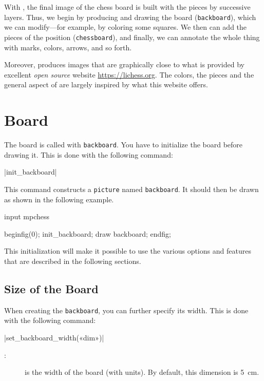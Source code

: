 \documentclass[english]{ltxdoc}
\begin{document}
With \mpchess, the final image of the chess board is built with the pieces
by successive layers. Thus, we begin by producing and drawing the board
(\lstinline+backboard+), which we can modify---for example, by
coloring some squares. We then can add the pieces of the position (\lstinline+chessboard+),
and finally, we can annotate the whole thing with marks, colors,
arrows, and so forth. 


Moreover, \mpchess produces images that are graphically close to what is
provided by excellent  \emph{open source} website \url{https://lichess.org}. The colors, the pieces and the general aspect of
\mpchess are largely inspired
by what this website offers.

\section{Board}

The board is called with \mpchess{} \lstinline+backboard+.
You have to initialize the board before drawing it. This is done with the
following command:\par

\commande|init_backboard|\smallskip{}

This command constructs a \MP{} \lstinline+picture+ named
\mbox{\lstinline+backboard+.} It should then be drawn as shown in the following example.
\begin{ExempleMP}
input mpchess

beginfig(0);
init_backboard;
draw backboard;
endfig;
\end{ExempleMP}

This initialization will make it possible to use the
various options and features that are described in the
following sections.

\subsection{Size of the Board}

When creating the \lstinline+backboard+, you can further specify its width. This is done with the following command:\par\bigskip

\commande|set_backboard_width(«dim»)|\smallskip{}

\begin{description}
  \item[:] is the width of the board (with units). By default, this dimension is \SI{5}{cm}.
\end{description}
\end{document}
